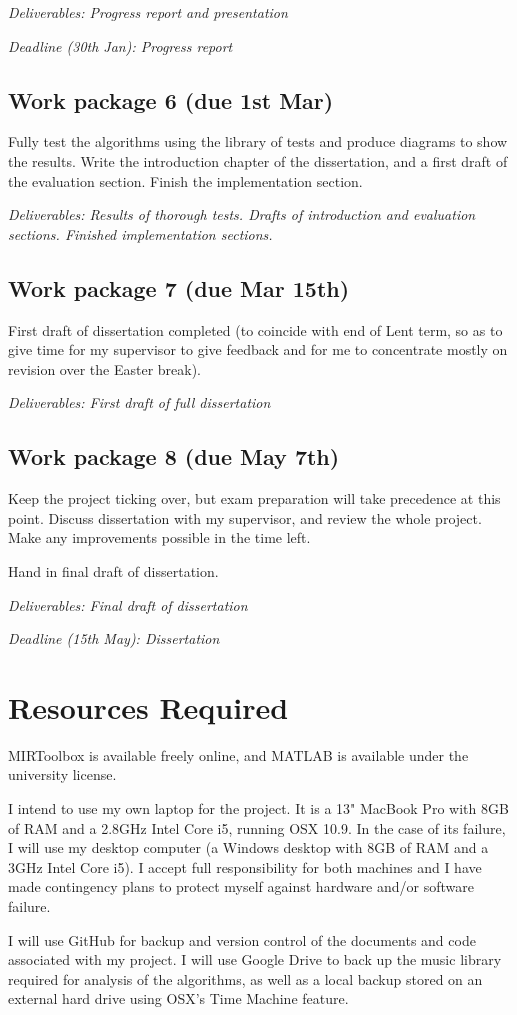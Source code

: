 \documentclass[12pt]{article}
\begin{document}
\emph{Deliverables: Progress report and presentation}

\emph{Deadline (30th Jan): Progress report}

\subsection*{Work package 6 (due 1st Mar)}
Fully test the algorithms using the library of tests and produce diagrams to show the results. Write the introduction chapter of the dissertation, and a first draft of the evaluation section. Finish the implementation section.

\emph{Deliverables: Results of thorough tests. Drafts of introduction and evaluation sections. Finished implementation sections.}

\subsection*{Work package 7 (due Mar 15th)}
First draft of dissertation completed (to coincide with end of Lent term, so as to give time for my supervisor to give feedback and for me to concentrate mostly on revision over the Easter break).

\emph{Deliverables: First draft of full dissertation}

\subsection*{Work package 8 (due May 7th)}
Keep the project ticking over, but exam preparation will take precedence at this point. Discuss dissertation with my supervisor, and review the whole project. Make any improvements possible in the time left.

Hand in final draft of dissertation. 

\emph{Deliverables: Final draft of dissertation}

\emph{Deadline (15th May): Dissertation}


\section*{Resources Required}

 MIRToolbox is available freely online, and MATLAB is available under the university license.

I intend to use my own laptop for the project. It is a 13" MacBook Pro with 8GB of RAM and a 2.8GHz Intel Core i5, running OSX 10.9. In the case of its failure, I will use my desktop computer (a Windows desktop with 8GB of RAM and a 3GHz Intel Core i5). I accept full responsibility for both machines and I have made contingency plans to protect myself against hardware and/or software failure.

I will use GitHub for backup and version control of the documents and code associated with my project. I will use Google Drive to back up the music library required for analysis of the algorithms, as well as a local backup stored on an external hard drive using OSX's Time Machine feature.
\end{document}
